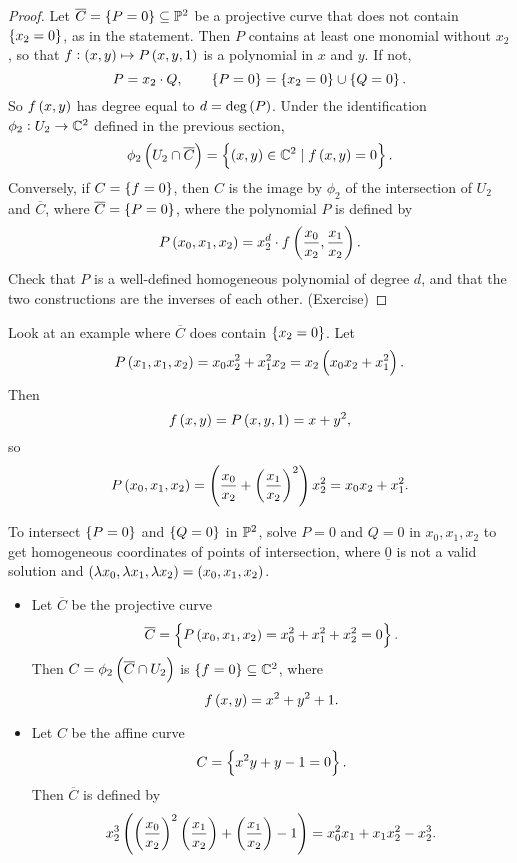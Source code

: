 \begin{proof}
Let $ \overline{C} = \cbr{P = 0} \subseteq \P^2 $ be a projective curve that does not contain $ \cbr{x_2 = 0} $, as in the statement. Then $ P $ contains at least one monomial without $ x_2 $, so that $ f : \br{x, y} \mapsto P\br{x, y, 1} $ is a polynomial in $ x $ and $ y $. If not,
$$ P = x_2 \cdot Q, \qquad \cbr{P = 0} = \cbr{x_2 = 0} \cup \cbr{Q = 0}. $$
So $ f\br{x, y} $ has degree equal to $ d = \deg\br{P} $. Under the identification $ \phi_2 : U_2 \to \C^2 $ defined in the previous section,
$$ \phi_2\br{U_2 \cap \overline{C}} = \cbr{\br{x, y} \in \C^2 \mid f\br{x, y} = 0}. $$
Conversely, if $ C = \cbr{f = 0} $, then $ C $ is the image by $ \phi_2 $ of the intersection of $ U_2 $ and $ \overline{C} $, where $ \overline{C} = \cbr{P = 0} $, where the polynomial $ P $ is defined by
$$ P\br{x_0, x_1, x_2} = x_2^d \cdot f\br{\dfrac{x_0}{x_2}, \dfrac{x_1}{x_2}}. $$
Check that $ P $ is a well-defined homogeneous polynomial of degree $ d $, and that the two constructions are the inverses of each other. (Exercise)
\end{proof}

\pagebreak

\begin{example*}
Look at an example where $ \overline{C} $ does contain $ \cbr{x_2 = 0} $. Let
$$ P\br{x_1, x_1, x_2} = x_0x_2^2 + x_1^2x_2 = x_2\br{x_0x_2 + x_1^2}. $$
Then
$$ f\br{x, y} = P\br{x, y, 1} = x + y^2, $$
so
$$ P\br{x_0, x_1, x_2} = \br{\dfrac{x_0}{x_2} + \br{\dfrac{x_1}{x_2}}^2}x_2^2 = x_0x_2 + x_1^2. $$
\end{example*}

\begin{remark*}
To intersect $ \cbr{P = 0} $ and $ \cbr{Q = 0} $ in $ \P^2 $, solve $ P = 0 $ and $ Q = 0 $ in $ x_0, x_1, x_2 $ to get homogeneous coordinates of points of intersection, where $ \underline{0} $ is not a valid solution and $ \br{\lambda x_0, \lambda x_1, \lambda x_2} = \br{x_0, x_1, x_2} $.
\end{remark*}

\begin{example}
\hfill
\begin{itemize}
\item Let $ \overline{C} $ be the projective curve
$$ \overline{C} = \cbr{P\br{x_0, x_1, x_2} = x_0^2 + x_1^2 + x_2^2 = 0}. $$
Then $ C = \phi_2\br{\overline{C} \cap U_2} $ is $ \cbr{f = 0} \subseteq \C^2 $, where
$$ f\br{x, y} = x^2 + y^2 + 1. $$
\item Let $ C $ be the affine curve
$$ C = \cbr{x^2y + y - 1 = 0}. $$
Then $ \overline{C} $ is defined by
$$ x_2^3\br{\br{\dfrac{x_0}{x_2}}^2\br{\dfrac{x_1}{x_2}} + \br{\dfrac{x_1}{x_2}} - 1} = x_0^2x_1 + x_1x_2^2 - x_2^3. $$
\end{itemize}
\end{example}

